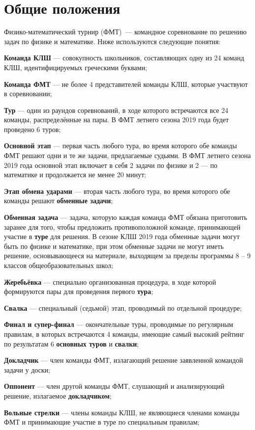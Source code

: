 \documentclass[12pt,a4paper]{article}
\begin{document}
\section{Общие положения}
Физико-математический турнир (ФМТ)~--- командное соревнование по решению задач по физике и математике. Ниже используются следующие понятия:
\begin{list}{.}{\leftmargin=10mm  \topsep=0mm  \itemsep=1pt \parsep=0mm \itemindent=-15pt}
\item \textbf{Команда КЛШ} --- совокупность школьников, составляющих одну из 24 команд КЛШ, идентифицируемых греческими буквами;
\item \textbf{Команда ФМТ} --- не более 4 представителей команды КЛШ, которые участвуют в соревновании;
\item \textbf{Тур} --- один из раундов соревнований, в ходе которого встречаются все 24 команды, распределённые на пары. В ФМТ летнего сезона 2019 года будет проведено 6 туров;
\item \textbf{Основной этап} --- первая часть любого тура, во время которого обе команды ФМТ решают одни и те же задачи, предлагаемые судьями. В ФМТ летнего сезона 2019 года основной этап включает в себя 2 задачи по физике и 2 --- по математике и продолжается не менее 20 минут;
\item \textbf{Этап обмена ударами} --- вторая часть любого тура, во время которого обе команды решают \textbf{обменные задачи};
\item \textbf{Обменная задача} --- задача, которую каждая команда ФМТ обязана приготовить заранее для того, чтобы предложить противоположной команде, принимающей участие в \textbf{туре} для решения. В сезоне КЛШ 2019 года обменные задачи могут быть по физике и математике, при этом обменные задачи не могут иметь решение, основывающееся на материале, выходящем за пределы программы 8 -- 9 классов общеобразовательных школ;
\item \textbf{Жеребьёвка} --- специально организованная процедура, в ходе которой формируются пары для проведения первого \textbf{тура};
\item \textbf{Свалка} --- специальный (седьмой) этап, проводимый по отдельной процедуре;
\item \textbf{Финал и супер-финал} --- окончательные туры, проводимые по регулярным правилам, в которых встречаются 4 команды, имеющие самый высокий рейтинг по результатам 6 \textbf{основных туров} и \textbf{свалки};
\item \textbf{Докладчик} --- член команды ФМТ, излагающий решение заявленной командой задачи у доски;
\item \textbf{Оппонент} --- член другой команды ФМТ, слушающий и анализирующий решение, излагаемое \textbf{докладчиком};
\item \textbf{Вольные стрелки} --- члены команды КЛШ, не являющиеся членами команды ФМТ и принимающие участие в туре по специальным правилам;
\end{list}
\end{document}
